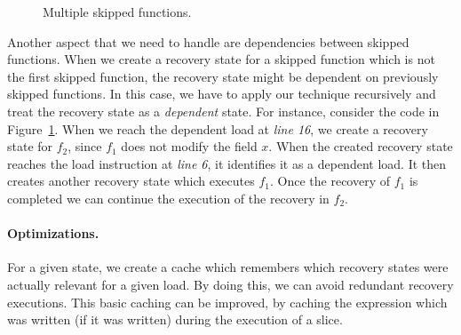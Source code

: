 \begin{figure}[tbp]

\caption{Multiple skipped functions.}
\label{fig:multiple-skipped-functions}
\end{figure}


Another aspect that we need to handle are dependencies between
skipped functions.  When we create a recovery state for a skipped
function which is not the first skipped function, the recovery state
might be dependent on previously skipped functions.  In this case, we
have to apply our technique recursively and treat the recovery state
as a \textit{dependent} state.  For instance, consider the code in
Figure~\ref{fig:multiple-skipped-functions}.  When we reach the
dependent load at \textit{line 16}, we create a recovery state for
$f_2$, since $f_1$ does not modify the field $x$.  When the created
recovery state reaches the load instruction at \textit{line 6}, it
identifies it as a dependent load.  It then creates another recovery
state which executes $f_1$.  Once the recovery of $f_1$ is completed
we can continue the execution of the recovery in $f_2$.

\paragraph{Optimizations.} For a given state, we create a cache which
remembers which recovery states were actually relevant for a given
load.  By doing this, we can avoid redundant recovery executions.
This basic caching can be improved, by caching the expression which
was written (if it was written) during the execution of a slice.




